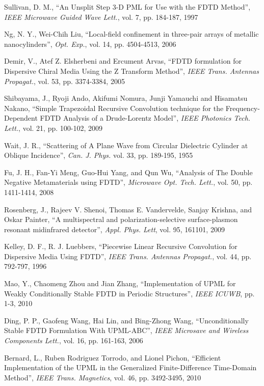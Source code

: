 \begin{thebibliography}{999}
  \bibitem
  {}
  Sullivan, D. M.,
  ``An Unsplit Step 3-D PML for Use with the FDTD Method'',
  \textit{IEEE Microwave Guided Wave Lett.}, 
  vol. 7,
  pp. 184-187,
  1997

  \bibitem
  {}
  Ng, N. Y., Wei-Chih Liu,
  ``Local-field confinement in three-pair arrays of metallic nanocylinders'',
  \textit{Opt. Exp.},
  vol. 14,
  pp. 4504-4513,
  2006

  \bibitem
  {}
  Demir, V., Atef Z. Elsherbeni and Ercument Arvas,
  ``FDTD formulation for Dispersive Chiral Media Using the Z Transform Method'',
  \textit{IEEE Trans. Antennas Propagat.},
  vol. 53,
  pp. 3374-3384,
  2005

  \bibitem
  {}  
  Shibayama, J., Ryoji Ando, Akifumi Nomura, Junji Yamauchi and Hisamatsu Nakano,
  ``Simple Trapezoidal Recursive Convolution technique for the Frequency-Dependent FDTD Analysis of a Drude-Lorentz Model'',
  \textit{IEEE Photonics Tech. Lett.},
  vol. 21,
  pp. 100-102,
  2009

  \bibitem
  {}
  Wait, J. R.,
  ``Scattering of A Plane Wave from Circular Dielectric Cylinder at Oblique Incidence'',
  \textit{Can. J. Phys.}
  vol. 33,
  pp. 189-195,
  1955

  \bibitem
  {}
  Fu, J. H., Fan-Yi Meng, Guo-Hui Yang, and Qun Wu,
  ``Analysis of The Double Negative Metamaterials using FDTD'',
  \textit{Microwave Opt. Tech. Lett.},
  vol. 50,
  pp. 1411-1414,
  2008

  \bibitem
  {}
  Rosenberg, J., Rajeev V. Shenoi, Thomas E. Vandervelde, Sanjay Krishna, and Oskar Painter,
  ``A multispectral and polarization-selective surface-plasmon resonant midinfrared detector'',
  \textit{Appl. Phys. Lett},
  vol. 95,
  161101,
  2009

  \bibitem
  {}
  Kelley, D. F., R. J. Luebbers,
  ``Piecewise Linear Recursive Convolution for Dispersive Media Using FDTD'',
  \textit{IEEE Trans. Antennas Propagat.},
  vol. 44,
  pp. 792-797,
  1996

  \bibitem
  {}
  Mao, Y., Chaomeng Zhou and Jian Zhang,
  ``Implementation of UPML for Weakly Conditionally Stable FDTD in Periodic Structures'',
  \textit{IEEE ICUWB},
  pp. 1-3,
  2010

  \bibitem
  {}
  Ding, P. P., Gaofeng Wang, Hai Lin, and Bing-Zhong Wang,
  ``Unconditionally Stable FDTD Formulation With UPML-ABC'',
  \textit{IEEE Microsave and Wireless Components Lett.},
  vol. 16,
  pp. 161-163,
  2006

  \bibitem
  {}
  Bernard, L., Ruben Rodriguez Torrodo, and Lionel Pichon,
  ``Efficient Implementation of the UPML in the Generalized Finite-Difference Time-Domain Method'',
  \textit{IEEE Trans. Magnetics},
  vol. 46,
  pp. 3492-3495,
  2010


\end{thebibliography}
